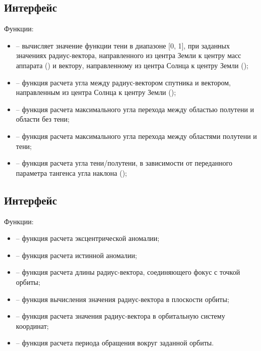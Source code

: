 \subsection{Интерфейс }
\noindent\indent Функции:
\begin{itemize}
    \item {} -- вычисляет значение
    функции тени в диапазоне [0, 1], при заданных значениях радиус-вектора, направленного
    из центра Земли к центру масс аппарата () и вектору, направленному из центра Солнца
    к центру Земли ();
    \item {} -- функция расчета угла между радиус-вектором спутника
    и вектором, направленным из центра Солнца к центру Земли ();
    \item {} -- функция расчета максимального
    угла перехода между областью полутени и области без тени;
    \item {} -- функция расчета максимального
    угла перехода между областями полутени и тени;
    \item {} --
    функция расчета угла тени/полутени, в зависимости от переданного параметра
    тангенса угла наклона ();
\end{itemize}
\subsection{Интерфейс }
\noindent\indent Функции:
\begin{itemize}
    \item {} -- функция расчета эксцентрической аномалии;
    \item {} --
    функция расчета истинной аномалии;
    \item {} --
    функция расчета длины радиус-вектора, соединяющего фокус с точкой орбиты;
    \item {} -- функция вычисления значения радиус-вектора
    в плоскости орбиты;
    \item {} --
    функция расчета значения радиус-вектора в орбитальную систему координат;
    \item {} --
    функция расчета периода обращения вокруг заданной орбиты.
\end{itemize}
